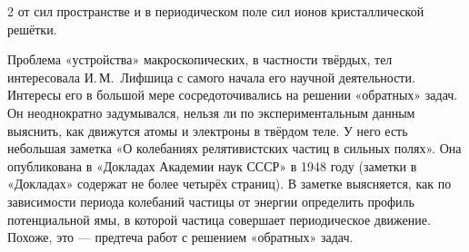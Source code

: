 \documentclass[a4paper,10pt]{article}
\begin{document}
\begin{minipage}[t]{0.64\textwidth}

  \begin{multicols}{2}
  \raggedcolumns
  от сил пространстве и в периодическом поле сил
  ионов кристаллической решётки.

  Проблема «устройства» макроскопических, в частности твёрдых, тел
  интересовала И.\,М.~Лифшица с самого начала его научной деятельности.
  Интересы его в большой мере сосредоточивались на решении «обратных»
  задач. Он неоднократно задумывался, нельзя ли по экспериментальным
  данным выяснить, как движутся атомы и электроны в твёрдом теле.
  У него есть небольшая заметка «О колебаниях релятивистских частиц
  в сильных полях». Она опубликована в «Докладах Академии наук СССР»
  в 1948 году (заметки в «Докладах» содержат не более четырёх страниц).
  В заметке выясняется, как по зависимости периода колебаний частицы
  от энергии определить профиль потенциальной ямы, в которой частица
  совершает периодическое движение. Похоже, это — предтеча работ
  с решением «обратных» задач.
  \end{multicols}

  \begin{center}
  {\normalsize
  \renewcommand{\arraystretch}{1.2}
  \setlength{\tabcolsep}{4pt}

}
\end{center}
\end{minipage}
\end{document}
